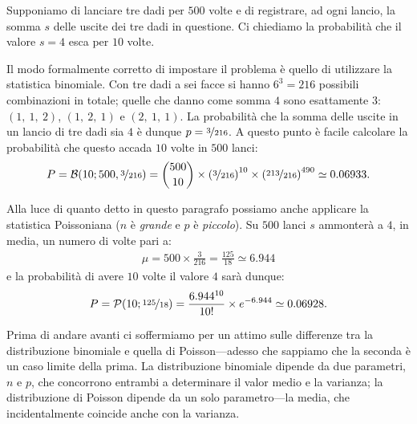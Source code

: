 \begin{examplebox}
  \begin{example}\label{exp:binomiale_poisson}
    Supponiamo di lanciare tre dadi per $500$ volte e di registrare, ad ogni
    lancio, la somma $s$ delle uscite dei tre dadi in questione. Ci chiediamo
    la probabilità che il valore $s = 4$ esca per $10$ volte.

    Il modo formalmente corretto di impostare il problema è quello di
    utilizzare la statistica binomiale. Con tre dadi a sei facce si hanno
    $6^3 = 216$ possibili combinazioni in totale; quelle che danno come somma
    $4$ sono esattamente $3$: $(1,~1,~2)$, $(1,~2,~1)$ e $(2,~1,~1)$.
    La probabilità che la somma delle uscite in un lancio di tre dadi sia
    $4$ è dunque $p = \nicefrac{3}{216}$. A questo punto è facile calcolare
    la probabilità che questo accada $10$ volte in $500$ lanci:
    \begin{align*}
      P = \binomialpdf[500, \nicefrac{3}{216}]{10} =
      \binom{500}{10} \times \left(\nicefrac{3}{216} \right)^{10}
      \times \left(\nicefrac{213}{216} \right)^{490} \simeq 0.06933.
    \end{align*}

    Alla luce di quanto detto in questo paragrafo possiamo anche
    applicare la statistica Poissoniana ($n$ è {\itshape grande}
    e $p$ è {\itshape piccolo}). Su $500$ lanci $s$ ammonterà a $4$,
    in media, un numero di volte pari a:
    \begin{align*}
      \mu = 500 \times \frac{3}{216} = \frac{125}{18} \simeq 6.944
    \end{align*}
    e la probabilità di avere $10$ volte il valore $4$ sarà dunque:
    \begin{align*}
      P = \poissonpdf[\nicefrac{125}{18}]{10} =
      \frac{6.944^{10}}{10!} \times e^{-6.944} \simeq 0.06928.
    \end{align*}
  \end{example}
\end{examplebox}

Prima di andare avanti ci soffermiamo per un attimo sulle differenze
tra la distribuzione binomiale e quella di Poisson---adesso che sappiamo che
la seconda è un caso limite della prima. La distribuzione binomiale dipende
da due parametri, $n$ e $p$, che concorrono entrambi a determinare il valor
medio e la varianza; la distribuzione di Poisson dipende da un solo
parametro---la media, che incidentalmente coincide anche con la varianza.

